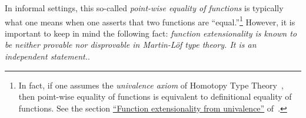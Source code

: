 \ccpad
In informal settings, this so-called \emph{point-wise equality of functions} is typically what one means when one
asserts that two functions are ``equal.''\footnote{In fact, if one assumes the \emph{univalence axiom} of Homotopy Type Theory~\cite{HoTT}, then point-wise equality of functions is equivalent to definitional equality of functions. See the section \href{https://www.cs.bham.ac.uk/~mhe/HoTT-UF-in-Agda-Lecture-Notes/HoTT-UF-Agda.html\#funextfromua}{``Function extensionality from univalence''} of~\cite{MHE}.} However, it is important to keep in mind the following fact: \textit{function extensionality is known to be neither provable nor disprovable in Martin-Löf type theory. It is an independent statement.}.~\cite{MHE}

